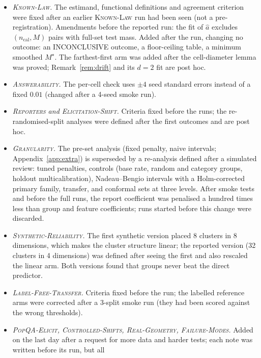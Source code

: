 \documentclass[11pt]{article}
\theoremstyle{definition}
\theoremstyle{remark}
\newcommand{\1}{\mathbf{1}}
\newcommand{\expname}[1]{\textsc{#1}}
\begin{document}
\begin{itemize}
  \item \emph{\expname{Known-Law}.} The estimand, functional definitions and agreement criterion were fixed after an
  earlier \expname{Known-Law} run had been seen (not a pre-registration). Amendments before the reported run: the fit of
  $\hat a$ excludes $(n_{\mathrm{cal}},M)$ pairs with full-set test mass. Added after the run, changing no
  outcome: an INCONCLUSIVE outcome, a floor-ceiling table, a minimum smoothed $M^\star$. The farthest-first
  arm was added after the cell-diameter lemma was proved; Remark~\ref{rem:drift} and its $d=2$ fit are
  post hoc.
  \item \emph{\expname{Answerability}.} The per-cell check uses $\pm4$ seed standard errors instead of a fixed $0.01$
  (changed after a 4-seed smoke run).
  \item \emph{\expname{Reporters} and \expname{Elicitation-Shift}.} Criteria fixed before the runs; the re-randomised-split analyses
  were defined after the first outcomes and are post hoc.
  \item \emph{\expname{Granularity}.} The pre-set analysis (fixed penalty, naive intervals; Appendix~\ref{app:extra}) is
  superseded by a re-analysis defined after a simulated review: tuned penalties, controls (base rate,
  random and category groups, holdout multicalibration), Nadeau--Bengio intervals with a Holm-corrected
  primary family, transfer, and conformal sets at three levels. After smoke tests and before the full
  runs, the report coefficient was penalised a hundred times less than group and feature coefficients;
  runs started before this change were discarded.
  \item \emph{\expname{Synthetic-Reliability}.} The first synthetic version placed 8 clusters in 8 dimensions, which makes the cluster
  structure linear; the reported version (32 clusters in 4 dimensions) was defined after seeing the
  first and also rescaled the linear arm. Both versions found that groups never beat the direct predictor.
  \item \emph{\expname{Label-Free-Transfer}.} Criteria fixed before the run; the labelled reference arms were corrected after a
  3-split smoke run (they had been scored against the wrong thresholds).
  \item \emph{\expname{PopQA-Elicit}, \expname{Controlled-Shifts}, \expname{Real-Geometry}, \expname{Failure-Modes}.} Added on the
  last day after a request for more data and harder tests; each note was written before its run, but all

\end{itemize}
\end{document}
